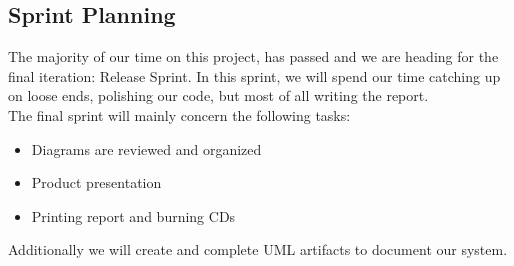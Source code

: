 \subsection{Sprint Planning}
The majority of our time on this project, has passed and we are heading for the final iteration: Release Sprint. In this sprint, we will spend our time catching up on loose ends, polishing our code, but most of all writing the report.\\
The final sprint will mainly concern the following tasks: 
\begin{itemize}
\item Diagrams are reviewed and organized
\item Product presentation 
\item Printing report and burning CDs
\end{itemize}
Additionally we will create and complete UML artifacts to document our system.